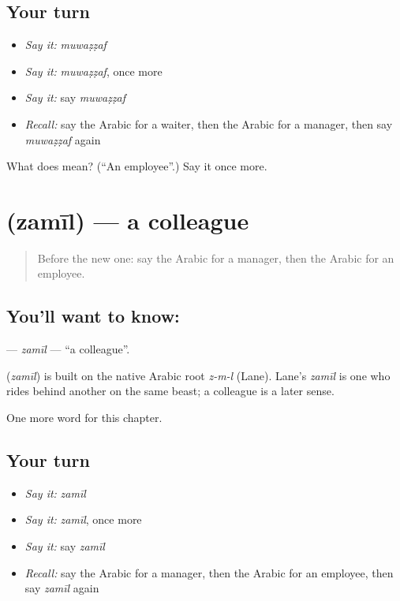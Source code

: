 \subsection*{Your turn}
\begin{itemize}
\raggedright
  \item \emph{Say it:} \emph{muwaẓẓaf}
  \item \emph{Say it:} \emph{muwaẓẓaf}, once more
  \item \emph{Say it:} say \emph{muwaẓẓaf}
  \item \emph{Recall:} say the Arabic for a waiter, then the Arabic for a manager, then say \emph{muwaẓẓaf} again
\end{itemize}

\begin{tcolorbox}[breakable,colback=teal!4,colframe=teal!35!black,title={Before you move on}]
What does  mean? (\textquotedblleft{}An employee\textquotedblright{}.) Say it once more.
\end{tcolorbox}
\section[\texorpdfstring{\ar{زميل} (zamīl)}{زميل (zamīl)}]{ (zamīl) — a colleague}

\label{lesson:AR-C251-zamil}



\begin{quote}
Before the new one: say the Arabic for a manager, then the Arabic for an employee.
\end{quote}

\subsection*{You'll want to know: }
\textbf{} — \emph{zamīl} — \textquotedblleft{}a colleague\textquotedblright{}.

\begin{cousinweb}
\textbf{} (\emph{zamīl}) is built on the native Arabic root \emph{z-m-l} (Lane). Lane's \emph{zamīl} is one who rides behind another on the same beast; a colleague is a later sense.
\end{cousinweb}

\begin{grammarlens}[title={What you've built}]
One more word for this chapter.
\end{grammarlens}

\subsection*{Your turn}
\begin{itemize}
\raggedright
  \item \emph{Say it:} \emph{zamīl}
  \item \emph{Say it:} \emph{zamīl}, once more
  \item \emph{Say it:} say \emph{zamīl}
  \item \emph{Recall:} say the Arabic for a manager, then the Arabic for an employee, then say \emph{zamīl} again
\end{itemize}

